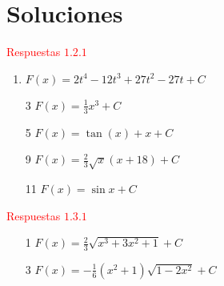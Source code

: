 \newpage
\chapter*{Soluciones}
\begin{multicols}{2}
\textcolor{red}{Respuestas $1.2.1$} \\


\begin{enumerate}
\item $F(x)=2t^{4}-12t^{3}+27t^{2}-27t+C$ \\
\item[3] $F(x)=\frac{1}{3}x^{3}+C$ \\
\item[5] $F(x)=\tan (x)+x+C$ \\
\item[9] $F(x)=\allowbreak \frac{2}{3}\sqrt{x}\left( x+18\right)+C $ \\
\item[11] $F(x)=\allowbreak \sin x+C$
 

\end{enumerate}


\textcolor{red}{Respuestas $1.3.1$} \\
 

 \begin{enumerate}
\item[1] $F(x)=\frac{2}{3}\sqrt{x^{3}+3x^{2}+1}+C$


\item[3] $F(x)=-\frac{1}{6}\left(x^{2}+1\right) \sqrt{1-2x^{2}}+C$  


\end{enumerate}
\end{multicols}
